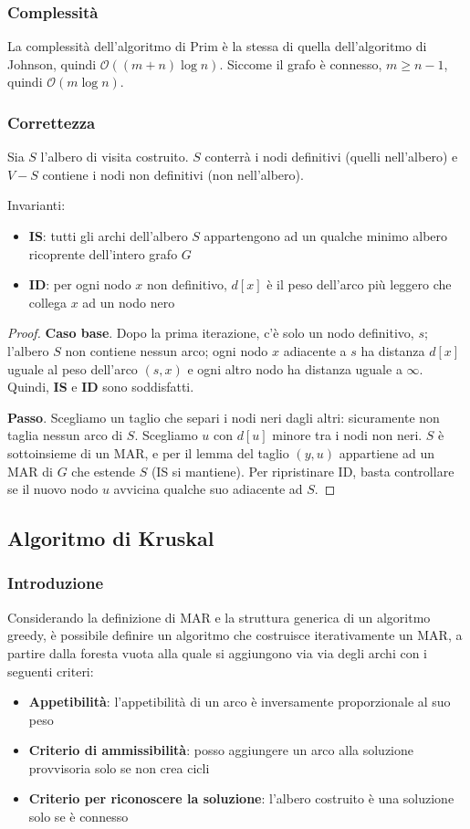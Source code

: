 \documentclass[11pt]{article}
\begin{document}
\subsubsection{Complessità}
La complessità dell'algoritmo di Prim è la stessa di quella dell'algoritmo di Johnson, quindi $\mathcal{O}((m+n)\log n)$. 
Siccome il grafo è connesso, $m\geq n-1$, quindi $\mathcal{O}(m\log n)$.
\subsubsection{Correttezza}
Sia $S$ l'albero di visita costruito. $S$ conterrà i nodi definitivi (quelli nell'albero) e $V-S$ contiene i nodi non 
definitivi (non nell'albero). 

Invarianti:
\begin{itemize}
    \item \textbf{IS}: tutti gli archi dell'albero $S$ appartengono ad un qualche minimo albero ricoprente dell'intero 
    grafo $G$
    \item \textbf{ID}: per ogni nodo $x$ non definitivo, $d[x]$ è il peso dell'arco più leggero che collega $x$ ad un nodo 
    nero 
\end{itemize}

\begin{proof}
    \textbf{Caso base}. Dopo la prima iterazione, c'è solo un nodo definitivo, $s$; l'albero $S$ non contiene nessun arco; 
    ogni nodo $x$ adiacente a $s$ ha distanza $d[x]$ uguale al peso dell'arco $(s,x)$ e ogni altro nodo ha distanza uguale 
    a $\infty$. Quindi, \textbf{IS} e \textbf{ID} sono soddisfatti.

    \textbf{Passo}. Scegliamo un taglio che separi i nodi neri dagli altri: sicuramente non taglia nessun arco di $S$.
    Scegliamo $u$ con $d[u]$ minore tra i nodi non neri. $S$ è sottoinsieme di un MAR, e per il lemma del taglio $(y,u)$ 
    appartiene ad un MAR di $G$ che estende $S$ (IS si mantiene). Per ripristinare ID, basta controllare se il nuovo nodo 
    $u$ avvicina qualche suo adiacente ad $S$.
\end{proof}
\subsection{Algoritmo di Kruskal}
\subsubsection{Introduzione}
Considerando la definizione di MAR e la struttura generica di un algoritmo greedy, è possibile definire un algoritmo che 
costruisce iterativamente un MAR, a partire dalla foresta vuota alla quale si aggiungono via via degli archi con i seguenti 
criteri:
\begin{itemize}
    \item \textbf{Appetibilità}: l'appetibilità di un arco è inversamente proporzionale al suo peso 
    \item \textbf{Criterio di ammissibilità}: posso aggiungere un arco alla soluzione provvisoria solo se non crea cicli 
    \item \textbf{Criterio per riconoscere la soluzione}: l'albero costruito è una soluzione solo se è connesso 
\end{itemize}
\end{document}
